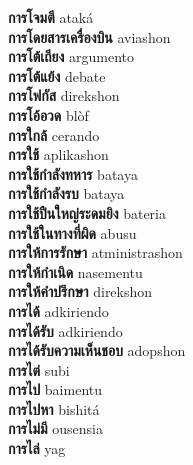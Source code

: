 \textbf{ การโจมตี  } ataká \\
\textbf{ การโดยสารเครื่องบิน  } aviashon \\
\textbf{ การโต้เถียง  } argumento \\
\textbf{ การโต้แย้ง  } debate \\
\textbf{ การโฟกัส  } direkshon \\
\textbf{ การโอ้อวด  } blòf \\
\textbf{ การใกล้  } cerando \\
\textbf{ การใช้  } aplikashon \\
\textbf{ การใช้กำลังทหาร  } bataya \\
\textbf{ การใช้กำลังรบ  } bataya \\
\textbf{ การใช้ปืนใหญ่ระดมยิง  } bateria \\
\textbf{ การใช้ในทางที่ผิด  } abusu \\
\textbf{ การให้การรักษา  } atministrashon \\
\textbf{ การให้กำเนิด  } nasementu \\
\textbf{ การให้คำปรึกษา  } direkshon \\
\textbf{ การได้  } adkiriendo \\
\textbf{ การได้รับ  } adkiriendo \\
\textbf{ การได้รับความเห็นชอบ  } adopshon \\
\textbf{ การไต่  } subi \\
\textbf{ การไป  } baimentu \\
\textbf{ การไปหา  } bishitá \\
\textbf{ การไม่มี  } ousensia \\
\textbf{ การไล่  } yag \\
